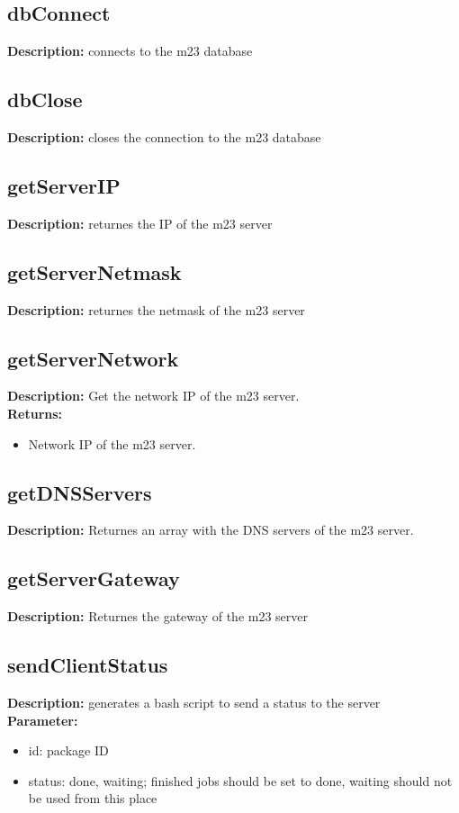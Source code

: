 \subsection{dbConnect}
\textbf{Description:} connects to the m23 database\\

\subsection{dbClose}
\textbf{Description:} closes the connection to the m23 database\\

\subsection{getServerIP}
\textbf{Description:} returnes the IP of the m23 server\\

\subsection{getServerNetmask}
\textbf{Description:} returnes the netmask of the m23 server\\

\subsection{getServerNetwork}
\textbf{Description:} Get the network IP of the m23 server.\\
\textbf{Returns:}
\begin{itemize}
\item Network IP of the m23 server.
\end{itemize}

\subsection{getDNSServers}
\textbf{Description:} Returnes an array with the DNS servers of the m23 server.\\

\subsection{getServerGateway}
\textbf{Description:} Returnes the gateway of the m23 server\\

\subsection{sendClientStatus}
\textbf{Description:} generates a bash script to send a status to the server\\
\textbf{Parameter:}
\begin{itemize}
\item id: package ID
\item status: done, waiting; finished jobs should be set to done, waiting should not be used from this place
\end{itemize}

